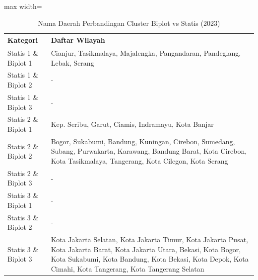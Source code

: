 \begin{table}[H]
\centering
\caption{Nama Daerah Perbandingan Cluster Biplot vs Statis (2023)} \label{tab:biplot_statis_name_2023}
\begin{adjustbox}{max width=\textwidth}
\begin{tabular}{|p{4cm}|p{10cm}|}
\hline
\textbf{Kategori} & \textbf{Daftar Wilayah} \\
\hline
Statis 1 \& Biplot 1 & Cianjur, Tasikmalaya, Majalengka, Pangandaran, Pandeglang, Lebak, Serang \\
\hline
Statis 1 \& Biplot 2 & - \\
\hline
Statis 1 \& Biplot 3 & - \\
\hline
Statis 2 \& Biplot 1 & Kep. Seribu, Garut, Ciamis, Indramayu, Kota Banjar \\
\hline
Statis 2 \& Biplot 2 & Bogor, Sukabumi, Bandung, Kuningan, Cirebon, Sumedang, Subang, Purwakarta, Karawang, Bandung Barat, Kota Cirebon, Kota Tasikmalaya, Tangerang, Kota Cilegon, Kota Serang \\
\hline
Statis 2 \& Biplot 3 & - \\
\hline
Statis 3 \& Biplot 1 & - \\
\hline
Statis 3 \& Biplot 2 & - \\
\hline
Statis 3 \& Biplot 3 & Kota Jakarta Selatan, Kota Jakarta Timur, Kota Jakarta Pusat, Kota Jakarta Barat, Kota Jakarta Utara, Bekasi, Kota Bogor, Kota Sukabumi, Kota Bandung, Kota Bekasi, Kota Depok, Kota Cimahi, Kota Tangerang, Kota Tangerang Selatan \\
\hline
\end{tabular}
\end{adjustbox}
\end{table}